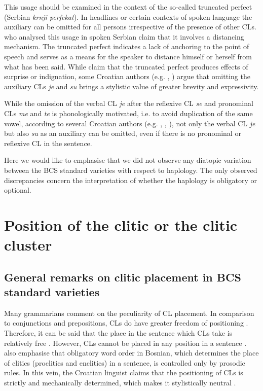 \noindent This usage should be examined in the context of the so-called truncated perfect (Serbian \textit{krnji perfekat}). In headlines or certain contexts of spoken language the auxiliary can be omitted for all persons irrespective of the presence of other CLs. \citet[98f]{MeermannSonnenhauser16} who analysed this usage in spoken Serbian claim that it involves a distancing mechanism. The truncated perfect indicates a lack of anchoring to the point of speech and serves as a means for the speaker to distance himself or herself from what has been said. While \citet[99f]{MeermannSonnenhauser16} claim that the truncated perfect produces effects of surprise or indignation, some Croatian authors (e.g. \citealt[41, 52, 55]{Katicic86}, \citealt[404, 596]{Baric97}) argue that omitting the auxiliary CLs \textit{je} and \textit{su} brings a stylistic value of greater brevity and expressivity. 

While the omission of the verbal CL \textit{je} after the reflexive CL \textit{se} and pronominal CLs \textit{me} and \textit{te} is phonologically motivated, i.e. to avoid duplication of the same vowel, according to several Croatian authors (e.g. \citealt[129]{TezakBabic96}, \citealt[41, 52, 55]{Katicic86}, \citealt[404, 596]{Baric97}), not only the verbal CL \textit{je} but also \textit{su} as an auxiliary can be omitted, even if there is no pronominal or reflexive CL in the sentence. 

Here we would like to emphasise that we did not observe any diatopic variation between the BCS standard varieties with respect to haplology. The only observed discrepancies concern the interpretation of whether the haplology is obligatory or optional. 

\section{Position of the clitic or the clitic cluster}
\label{Position of the clitic or clitic cluster}
\subsection{General remarks on clitic placement in BCS standard varieties}

Many grammarians comment on the peculiarity of CL placement. In comparison to conjunctions and prepositions, CLs do have greater freedom of positioning \citep[cf.][246]{TezakBabic96}. Therefore, it can be said that the place in the sentence which CLs take is relatively free \citep[cf.][450]{PiperKlajn14}. However, CLs cannot be placed in any position in a sentence \citep[cf.][246]{TezakBabic96}. \citet[470]{JHP00} also emphasise that obligatory word order in Bosnian, which determines the place of clitics (proclitics and enclitics) in a sentence, is controlled only by prosodic rules. In this vein, the Croatian linguist \citet[495]{Katicic86} claims that the positioning of CLs is strictly and mechanically determined, which makes it stylistically neutral \citep[495]{Katicic86}. 

